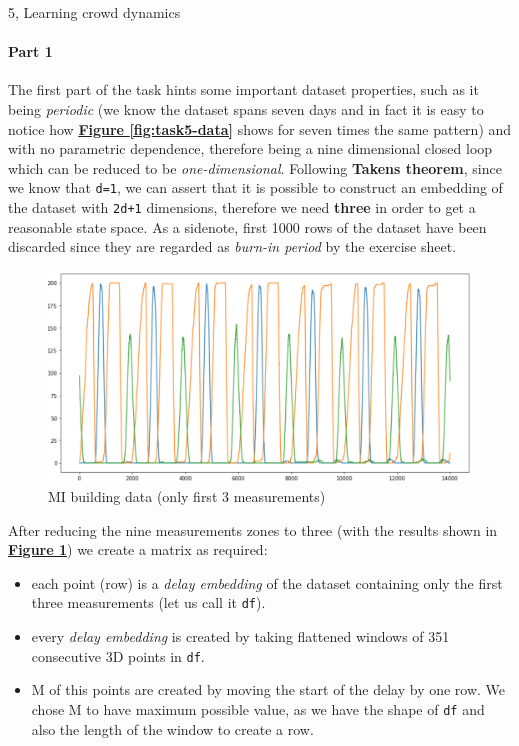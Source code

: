 \documentclass[10pt,a4paper]{article}
\begin{document}
\begin{task}{5, Learning crowd dynamics}
\paragraph{Part 1}
The first part of the task hints some important dataset properties, such as it being \textit{periodic} (we know the dataset spans seven days and in fact it is easy to notice how \textbf{\hyperref[fig:task5-data]{Figure \ref{fig:task5-data}}} shows for seven times the same pattern) and with no parametric dependence, therefore being a nine dimensional closed loop which can be reduced to be \textit{one-dimensional}. Following \textbf{Takens theorem}, since we know that \texttt{d=1}, we can assert that it is possible to construct an embedding of the dataset with \texttt{2d+1} dimensions, therefore we need \textbf{three} in order to get a reasonable state space. As a sidenote, first 1000 rows of the dataset have been discarded since they are regarded as \textit{burn-in period} by the exercise sheet.
\begin{figure}[H]
    \centering
    \includegraphics[scale=0.5]{images/task5-data-3.png}
    \caption{MI building data (only first 3 measurements)}
    \label{fig:task5-data-3}
\end{figure}
After reducing the nine measurements zones to three (with the results shown in \textbf{\hyperref[fig:task5-data-3]{Figure \ref{fig:task5-data-3}}}) we create a matrix as required:
\begin{itemize}
    \item each point (row) is a \textit{delay embedding} of the dataset containing only the first three measurements (let us call it \texttt{df}). 
    \item every \textit{delay embedding} is created by taking flattened windows of 351 consecutive 3D points in \texttt{df}.
    \item M of this points are created by moving the start of the delay by one row. We chose M to have maximum possible value, as we have the shape of \texttt{df} and also the length of the window to create a row.

\end{itemize}
\end{task}
\end{document}
